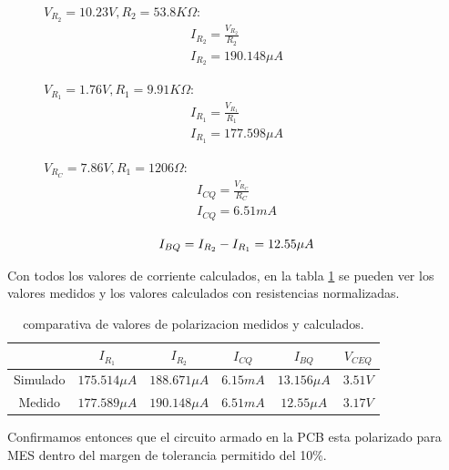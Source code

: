     \begin{figure}[!ht]
      \centering
      \begin{minipage}[t]{0.33\textwidth}
        $V_{R_2} = 10.23V, R_2 = 53.8K\Omega$:
        \begin{gather*}
          I_{R_2} = \frac{V_{R_2}}{R_2}\\[6pt]
          I_{R_2} = 190.148 \mu A
        \end{gather*}
      \end{minipage}
      \begin{minipage}[t]{0.32\textwidth}
        $V_{R_1} = 1.76V, R_1 = 9.91 K\Omega$:
        \begin{gather*}
          I_{R_1} = \frac{V_{R_1}}{R_1}\\[6pt]
          I_{R_1} = 177.598 \mu A
        \end{gather*}
      \end{minipage}
      \begin{minipage}[t]{0.33\textwidth}
        $V_{R_C} = 7.86V, R_1 = 1206\Omega$:
        \begin{gather*}
          I_{CQ} = \frac{V_{R_C}}{R_C}\\[6pt]
          I_{CQ} =  6.51 mA
        \end{gather*}
      \end{minipage}
    \end{figure}
    \begin{equation*}
      I_{BQ} = I_{R_2} - I_{R_1} = 12.55 \mu A\\[6pt]
    \end{equation*}

    Con todos los valores de corriente calculados, en la tabla \ref{tab:comparativa_real-calc} se pueden ver los valores
    medidos y los valores calculados con resistencias normalizadas.
    \begin{table}[!ht]
      \centering
      \begin{tabular}{|c|c|c|c|c|c|}
        \hline
                  & $I_{R_1}$       & $I_{R_2}$       & $I_{CQ}$  & $I_{BQ}$        & $V_{CEQ}$ \\ \hline
        Simulado  & $175.514 \mu A$ & $188.671 \mu A$ & $6.15 mA$ & $13.156 \mu A$  & $3.51V$   \\ \hline
        Medido    & $177.589 \mu A$ & $190.148 \mu A$ & $6.51 mA$ & $12.55 \mu A$   & $3.17V$   \\ \hline
      \end{tabular}
      \caption{comparativa de valores de polarizacion medidos y calculados.}
      \label{tab:comparativa_real-calc}
    \end{table}
    Confirmamos entonces que el circuito armado en la PCB esta polarizado para MES dentro del margen de tolerancia
    permitido del 10\%.

